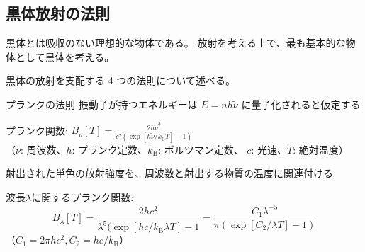 \documentclass[unicode,colorlinks]{beamer}
\newcommand{\centeralign}[1]{\rule{0pt}{0pt}\hfill#1\hfill\rule{0pt}{0pt}}
\newcommand{\Unit}[1]{\,\mathrm{#1}}
\begin{document}

\begin{frame}
	\section{黒体放射の法則}

	黒体とは吸収のない理想的な物体である。
	放射を考える上で、最も基本的な物体として黒体を考える。

	黒体の放射を支配する 4 つの法則について述べる。
\end{frame}






\begin{frame}{プランクの法則}
	振動子が持つエネルギーは $E=nh\tilde{\nu}$ に量子化されると仮定する

	プランク関数: $\displaystyle B_{\tilde{\nu}}[T]=\frac{2h\tilde{\nu}^3}{c^2(\exp[h\tilde{\nu}/k_\mathrm{B}T]-1)}$\\
	{\scriptsize （$\tilde{\nu}$: 周波数、$h$: プランク定数、$k_\mathrm{B}$: ボルツマン定数、
	$c$: 光速、$T$: 絶対温度）}

	射出された単色の放射強度を、周波数と射出する物質の温度に関連付ける

	波長$\lambda$に関するプランク関数:
	\[B_\lambda[T]=\frac{2hc^2}{\lambda^5(\exp[hc/k_\mathrm{B}\lambda T]-1}=
		\frac{C_1\lambda^{-5}}{\pi(\exp[C_2/\lambda T]-1)}\]
	{\scriptsize （$C_1=2\pi hc^2, C_2=hc/k_\mathrm{B}$）}
\end{frame}
\end{document}
